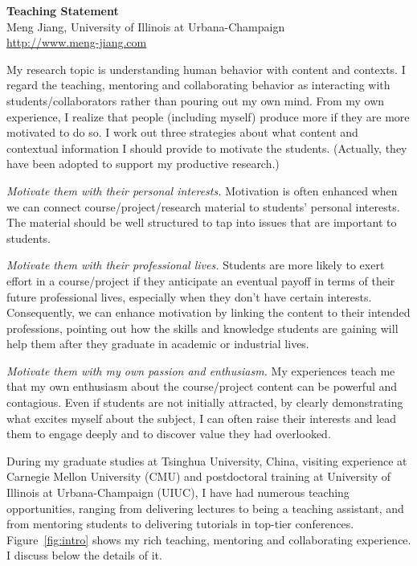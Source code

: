 \documentclass[10.5pt]{article}
\begin{document}
\begin{center}
{\LARGE \bf Teaching Statement} \\
\vskip 0.05in
{\large Meng Jiang, University of Illinois at Urbana-Champaign} \\
{\url{http://www.meng-jiang.com}}
\vskip -0.1in
\end{center}

My research topic is understanding human behavior with content and contexts. I regard the teaching, mentoring and collaborating behavior as interacting with students/collaborators rather than pouring out my own mind. From my own experience, I realize that people (including myself) produce more if they are more motivated to do so. I work out three strategies about what content and contextual information I should provide to motivate the students. (Actually, they have been adopted to support my productive research.)
\begin{compactitem}
\item \textit{Motivate them with their personal interests.} Motivation is often enhanced when we can connect course/project/research material to students' personal interests. The material should be well structured to tap into issues that are important to students. %
\item \textit{Motivate them with their professional lives.} Students are more likely to exert effort in a course/project if they anticipate an eventual payoff in terms of their future professional lives, especially when they don't have certain interests. Consequently, we can enhance motivation by linking the content to their intended professions, pointing out how the skills and knowledge students are gaining will help them after they graduate in academic or industrial lives.
\item \textit{Motivate them with my own passion and enthusiasm.} My experiences teach me that my own enthusiasm about the course/project content can be powerful and contagious. Even if students are not initially attracted, by clearly demonstrating what excites myself about the subject, I can often raise their interests and lead them to engage deeply and to discover value they had overlooked.
\end{compactitem}
During my graduate studies at Tsinghua University, China, visiting experience at Carnegie Mellon University (CMU) and postdoctoral training at University of Illinois at Urbana-Champaign (UIUC), I have had numerous teaching opportunities, ranging from delivering lectures to being a teaching assistant, and from mentoring students to delivering tutorials in top-tier conferences. Figure~\ref{fig:intro} shows my rich teaching, mentoring and collaborating experience. I discuss below the details of it.
\end{document}
